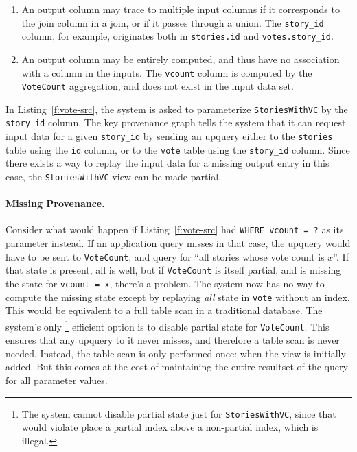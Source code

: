 \begin{enumerate}
  \item An output column may trace to multiple input columns if it corresponds
    to the join column in a join, or if it passes through a union. The
    \texttt{story\_id} column, for example, originates both in
    \texttt{stories.id} and \texttt{votes.story\_id}.
  \item An output column may be entirely computed, and thus have no association
    with a column in the inputs. The \texttt{vcount} column is computed by the
    \texttt{VoteCount} aggregation, and does not exist in the input data set.
\end{enumerate}

In Listing~\ref{f:vote-src}, the system is asked to parameterize
\texttt{StoriesWithVC} by the \texttt{story\_id} column. The key provenance
graph tells the system that it can request input data for a given
\texttt{story\_id} by sending an upquery either to the \texttt{stories} table
using the \texttt{id} column, or to the \texttt{vote} table using the
\texttt{story\_id} column. Since there exists a way to replay the input data for
a missing output entry in this case, the \texttt{StoriesWithVC} view can be made
partial.

\paragraph{Missing Provenance.}
Consider what would happen if Listing~\ref{f:vote-src} had \texttt{WHERE vcount
= ?} as its parameter instead. If an application query misses in that case, the
upquery would have to be sent to \texttt{VoteCount}, and query for ``all stories
whose vote count is $x$''. If that state is present, all is well, but if
\texttt{VoteCount} is itself partial, and is missing the state for
\texttt{vcount = x}, there's a problem. The system now has no way to compute the
missing state except by replaying \emph{all} state in \texttt{vote} without an
index. This would be equivalent to a full table scan in a traditional database.
The system's only%
%
\footnote{The system cannot disable partial state just for
\texttt{StoriesWithVC}, since that would violate place a partial index above a
non-partial index, which is illegal.}
%
efficient option is to disable partial
state for \texttt{VoteCount}. This ensures that any upquery to it never misses,
and therefore a table scan is never needed. Instead, the table scan is only
performed once: when the view is initially added. But this comes at the cost of
maintaining the entire resultset of the query for all parameter values.

